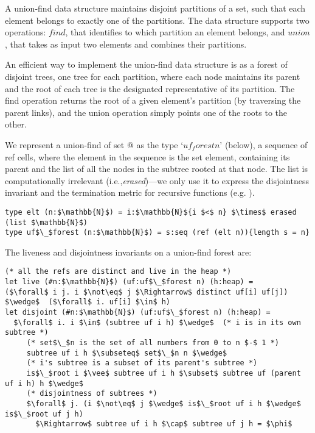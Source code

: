 \documentclass[sigplan,screen]{acmart}\settopmatter{}
\newcommand*{\IE}{i.e.,\xspace}
\begin{document}
 A union-find data structure
maintains disjoint partitions of a set, such that each
element belongs to exactly one of the partitions. The data structure
supports two operations: \ls$find$, that identifies to which partition an
element belongs, and \ls$union$, that takes as input two elements
and combines their partitions.

An efficient way to implement the union-find data structure is as a
forest of disjoint trees, one tree for each partition, where each node
maintains its parent and the root of each tree is the designated
representative of its partition.
%
The find operation returns the root of a given element's partition (by
traversing the parent links), and the union operation simply points
one of the roots to the other.

We represent a union-find of set
\ls@[0, n $-$ 1]@ as the type `\ls$uf_forest n$' (below),
a sequence of ref cells, where the  element in the
sequence is the  set element, containing its parent and the
list of all the nodes in the subtree rooted at that node. The list
is computationally irrelevant (\IE \emph{erased})---we only use it to
express the disjointness invariant and the termination metric for
recursive functions (e.g. ).

\begin{lstlisting}
type elt (n:$\mathbb{N}$) = i:$\mathbb{N}${i $<$ n} $\times$ erased (list $\mathbb{N}$)
type uf$\_$forest (n:$\mathbb{N}$) = s:seq (ref (elt n)){length s = n}
\end{lstlisting}

\iffull
The liveness and disjointness invariants on a union-find forest are:

\begin{lstlisting}
(* all the refs are distinct and live in the heap *)
let live (#n:$\mathbb{N}$) (uf:uf$\_$forest n) (h:heap) =
($\forall$ i j. i $\not\eq$ j $\Rightarrow$ distinct uf[i] uf[j])  $\wedge$  ($\forall$ i. uf[i] $\in$ h)
let disjoint (#n:$\mathbb{N}$) (uf:uf$\_$forest n) (h:heap) =
  $\forall$ i. i $\in$ (subtree uf i h) $\wedge$  (* i is in its own subtree *)
     (* set$\_$n is the set of all numbers from 0 to n $-$ 1 *)
     subtree uf i h $\subseteq$ set$\_$n n $\wedge$
     (* i's subtree is a subset of its parent's subtree *)
     is$\_$root i $\vee$ subtree uf i h $\subset$ subtree uf (parent uf i h) h $\wedge$
     (* disjointness of subtrees *)
     $\forall$ j. (i $\not\eq$ j $\wedge$ is$\_$root uf i h $\wedge$ is$\_$root uf j h)
       $\Rightarrow$ subtree uf i h $\cap$ subtree uf j h = $\phi$
\end{lstlisting}
\end{document}
